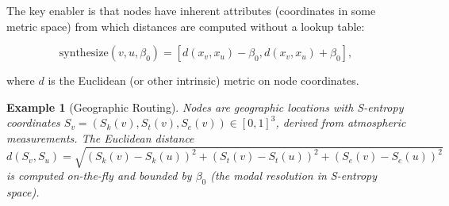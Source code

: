 \documentclass[twocolumn,11pt,a4paper]{article}
\newtheorem{example}[theorem]{Example}
\theoremstyle{definition}
\begin{document}
The key enabler is that nodes have inherent attributes (coordinates in some metric space) from which distances are computed without a lookup table:

\begin{equation}
\text{synthesize}(v, u, \beta_0) = [d(x_v, x_u) - \beta_0, d(x_v, x_u) + \beta_0],
\end{equation}

where $d$ is the Euclidean (or other intrinsic) metric on node coordinates.

\begin{example}[Geographic Routing]
Nodes are geographic locations with S-entropy coordinates $S_v = (S_k(v), S_t(v), S_e(v)) \in [0,1]^3$, derived from atmospheric measurements. The Euclidean distance
\begin{equation}
d(S_v, S_u) = \sqrt{(S_k(v) - S_k(u))^2 + (S_t(v) - S_t(u))^2 + (S_e(v) - S_e(u))^2}
\end{equation}
is computed on-the-fly and bounded by $\beta_0$ (the modal resolution in S-entropy space).
\end{example}
\end{document}
